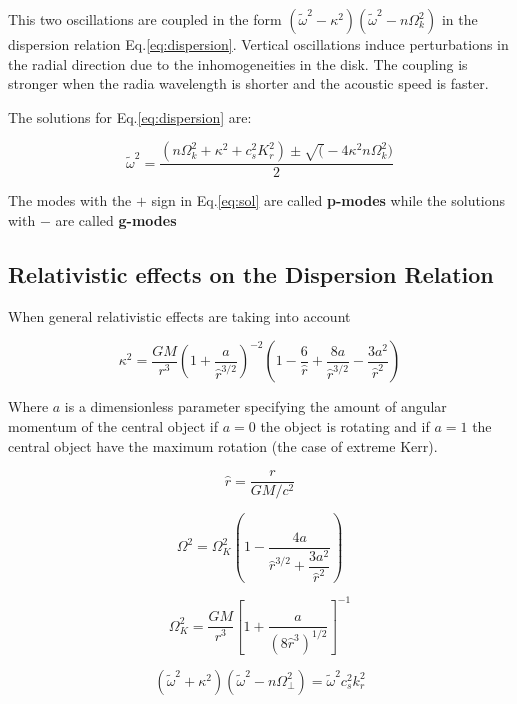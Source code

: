 This two oscillations are coupled in the form $(\tilde{\omega}^2 -
\kappa^2)(\tilde{\omega}^2 - n\Omega_k^2)$ in the dispersion relation
Eq.\ref{eq:dispersion}. Vertical oscillations induce perturbations
in the radial direction due to the inhomogeneities in the disk. The
coupling is stronger when the radia wavelength is shorter and the
acoustic speed is faster.

The solutions for Eq.\ref{eq:dispersion} are:

\begin{equation}\label{eq:sol}
\tilde{\omega}^2 = \dfrac{(n\Omega_k^2 + \kappa^2 + c_s^2 K_r^2) \pm
\sqrt( - 4\kappa^2n\Omega_k^2)}{2}
\end{equation}

The modes with the $+$ sign in Eq.\ref{eq:sol} are called
\textbf{p-modes} while the solutions with $-$ are called
\textbf{g-modes}

\subsection{Relativistic effects on the Dispersion Relation}

When general relativistic effects are taking into account 

\begin{equation}
\kappa^2 = \dfrac{GM}{r^3}\left( 1 + \dfrac{a}{\hat{r}^{3/2}}
\right)^{-2} \left(1 - \dfrac{6}{\hat{r}} + \dfrac{8a}{\hat{r}^{3/2}}
- \dfrac{3a^2}{\hat{r}^2}  \right)
\end{equation}

Where $a$ is a dimensionless parameter specifying the amount of
angular momentum of the central object if $a=0$ the object is rotating
and if $a=1$ the central object have the maximum rotation (the case of
extreme Kerr).

\begin{equation}
\hat{r} = \dfrac{r}{GM/c^2}
\end{equation}

\begin{equation}
\Omega_{}^2 = \Omega_{K}^2 \left(1 - \dfrac{4a}{\hat{r}^{3/2} +
\dfrac{3a^2}{\hat{r}^2}} \right)
\end{equation}

\begin{equation}
\Omega_K^2 = \dfrac{GM}{r^3} \left[ 1 + \dfrac{a}{(8
\hat{r}^3)^{1/2}}\right]^{-1}
\end{equation}

\begin{equation}
(\tilde{\omega}^2 + \kappa^2)(\tilde{\omega}^2 - n \Omega_{\bot}^2) =
\tilde{\omega}^2 c_s^2 k_{r}^2
\end{equation}


